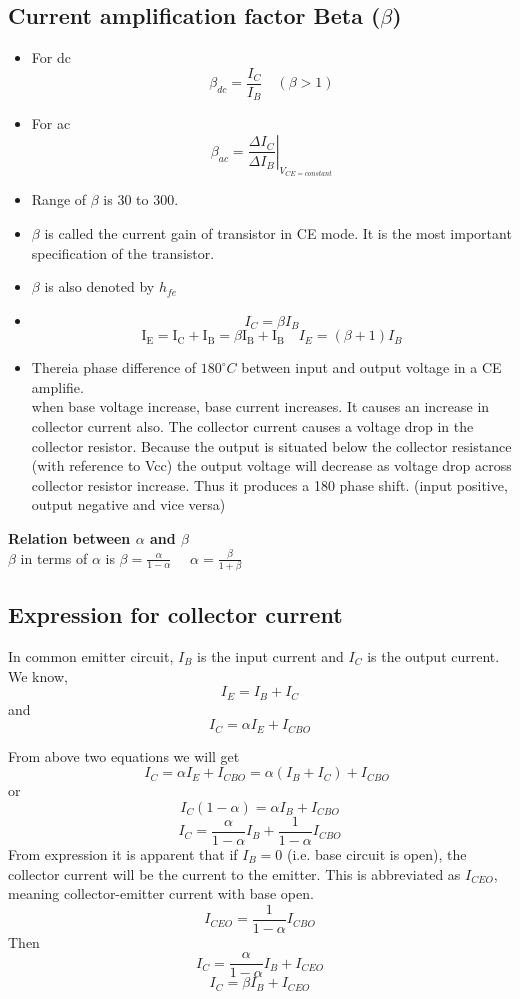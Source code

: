   \subsection{Current amplification factor Beta ($\beta$)}
  \begin{itemize}
  	\item  For dc $$ \beta_{d c}=\frac{I_{C}}{I_{B}} \quad(\beta>1)$$
  	\item  For ac $$\beta_{a c}=\left.\frac{\Delta I_{C}}{\Delta I_{B}}\right|_{V_{CE=constant}}$$
  	\item Range of $ \beta$ is 30  to 300.
  	\item $\beta$ is called the current gain of transistor in CE mode. It is the most important specification of the transistor.
  	\item $\beta$ is also denoted by $ h_{f e}$
  	\item 
  	$$I_{C}=\beta I_{B}$$
  		$$\mathrm{I}_{\mathrm{E}}=\mathrm{I}_{\mathrm{C}}+\mathrm{I}_{\mathrm{B}}=\beta \mathrm{I}_{\mathrm{B}}+\mathrm{I}_{\mathrm{B}} \quad I_{E}=(\beta+1) I_{B}$$
  		\item Thereia phase difference of $180^{\circ}C$ between input and output voltage  in a CE amplifie.\\
  		 when base voltage increase, base current increases. It causes an increase in collector current also. The collector current causes a voltage drop in the collector resistor. Because the output is situated below the collector resistance (with reference to Vcc) the output voltage will decrease as voltage drop across collector resistor increase. Thus it produces a 180 phase shift. (input positive, output negative and vice versa)
  	\end{itemize}
  		\textbf{Relation between $\alpha$ and $\beta$}\\
  		 $\beta$ in terms of $\alpha$ is $\beta=\frac{\alpha}{1-\alpha}$  $\quad \alpha=\frac{\beta}{1+\beta}$
\subsection{Expression for collector current}
 In common emitter circuit, $I_{B}$ is the input current and $I_{C}$ is the output current.
We know,
$$
I_{E}=I_{B}+I_{C}
$$
and
$$I_{C}=\alpha I_{E}+I_{C B O}$$

From above two equations we will get $$\quad I_{C}=\alpha I_{E}+I_{C B O}=\alpha\left(I_{B}+I_{C}\right)+I_{C B O}$$
or
$$
I_{C}(1-\alpha)=\alpha I_{B}+I_{C B O}
$$
$$
I_{C}=\frac{\alpha}{1-\alpha} I_{B}+\frac{1}{1-\alpha} I_{C B O}
$$
From expression it is apparent that if $I_{B}=0$ (i.e. base circuit is open), the collector current will be the current to the emitter. This is abbreviated as $I_{C E O}$, meaning collector-emitter current with base open.\\
$$I_{CEO}=\frac{1}{1-\alpha}I_{CBO}$$
Then $$I_C=\frac{\alpha}{1-\alpha} I_{B}+I_{CEO}$$
$$I_C=\beta I_B+I_{CEO}$$
